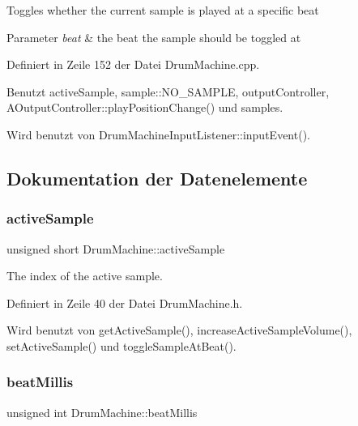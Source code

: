 Toggles whether the current sample is played at a specific beat 
\begin{DoxyParams}{Parameter}
{\em beat} & the beat the sample should be toggled at \\
\hline
\end{DoxyParams}


Definiert in Zeile 152 der Datei Drum\+Machine.\+cpp.



Benutzt active\+Sample, sample\+::\+N\+O\+\_\+\+S\+A\+M\+P\+LE, output\+Controller, A\+Output\+Controller\+::play\+Position\+Change() und samples.



Wird benutzt von Drum\+Machine\+Input\+Listener\+::input\+Event().



\subsection{Dokumentation der Datenelemente}
\mbox{\label{class_drum_machine_a9e12916e5724251791689e6f14c8513a}} 
\subsubsection{\texorpdfstring{active\+Sample}{activeSample}}
{\footnotesize\ttfamily unsigned short Drum\+Machine\+::active\+Sample\hspace{0.3cm}{\ttfamily [private]}}



The index of the active sample. 



Definiert in Zeile 40 der Datei Drum\+Machine.\+h.



Wird benutzt von get\+Active\+Sample(), increase\+Active\+Sample\+Volume(), set\+Active\+Sample() und toggle\+Sample\+At\+Beat().

\mbox{\label{class_drum_machine_a91179ac48de4159d04052291ad25fa02}} 
\subsubsection{\texorpdfstring{beat\+Millis}{beatMillis}}
{\footnotesize\ttfamily unsigned int Drum\+Machine\+::beat\+Millis\hspace{0.3cm}{\ttfamily [private]}}



